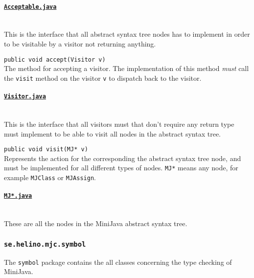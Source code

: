 \documentclass[11pt,oneside,a4paper]{article}
\newcommand{\code}[1]{\texttt{#1}}
\newcommand{\class}[1]{\underline{\texttt{#1}}}
\begin{document}
\paragraph{\class{Acceptable.java}} \hfill \\
This is the interface that all abstract syntax tree nodes has to implement in
order to be visitable by a visitor not returning anything.
\begin{description}
    \item{\code{public void accept(Visitor v)}} \hfill \\
        The method for accepting a visitor. The implementation of this method 
        \emph{must} call the
        \code{visit} method on the visitor \code{v} to dispatch back to the
        visitor. 
\end{description}


\paragraph{\class{Visitor.java}} \hfill \\
This is the interface that all visitors must that don't require any return type
must implement to be able to visit all nodes in the abstract syntax tree.
\begin{description}
    \item{\code{public void visit(MJ* v)}} \hfill \\
        Represents the action for the corresponding the abstract
        syntax tree node, and must be implemented for all different types of 
        nodes.  \code{MJ*} means any node, for example \code{MJClass} or
        \code{MJAssign}.
\end{description}

\paragraph{\class{MJ*.java}} \hfill \\
These are all the nodes in the MiniJava abstract syntax tree.

\subsubsection{\code{se.helino.mjc.symbol}}
The \code{symbol} package contains the all classes concerning the type
checking of MiniJava.
\end{document}
